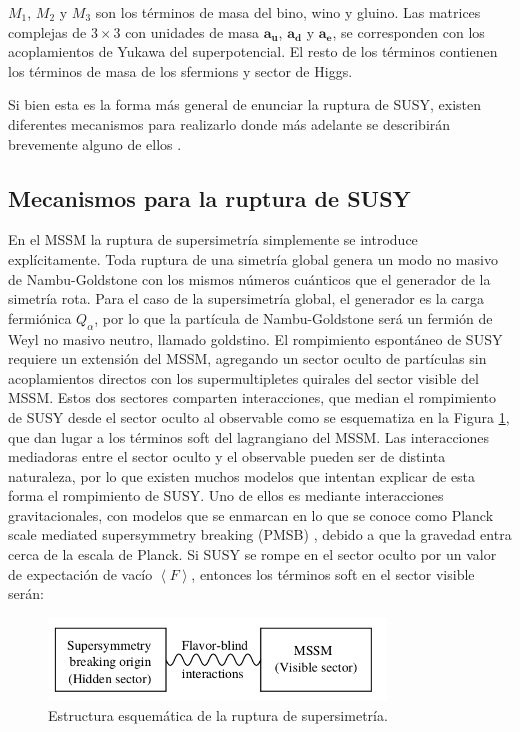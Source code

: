 $M_1$, $M_2$ y $M_3$ son los términos de masa del bino, wino y gluino. Las matrices complejas de $3\times3$ con unidades de masa $\textbf{a}_\textbf{u}$, $\textbf{a}_\textbf{d}$ y $\textbf{a}_\textbf{e}$, se corresponden con los acoplamientos de Yukawa del superpotencial. El resto de los términos contienen los términos de masa de los sfermions y sector de Higgs.

Si bien esta es la forma más general de enunciar la ruptura de SUSY, existen diferentes mecanismos para realizarlo donde más adelante se describirán brevemente alguno de ellos .

\subsection{Mecanismos para la ruptura de SUSY}

En el MSSM la ruptura de supersimetría simplemente se introduce explícitamente. Toda ruptura de una simetría global genera un modo no masivo de Nambu-Goldstone con los mismos números cuánticos que el generador de la simetría rota.
Para el caso de la supersimetría global, el generador es la carga fermiónica $Q_{\alpha}$,
por lo que la partícula de Nambu-Goldstone será un fermión de Weyl no masivo
neutro, llamado goldstino.
El rompimiento espontáneo de SUSY requiere un extensión del MSSM, agregando un sector oculto de partículas sin acoplamientos directos con los supermultipletes quirales del sector visible del
MSSM. Estos dos sectores comparten interacciones, que median el rompimiento de
SUSY desde el sector oculto al observable como se esquematiza en la Figura \ref{fig:hidden_sector}, que dan lugar a los términos soft del lagrangiano del MSSM.
Las interacciones mediadoras entre el sector oculto y el observable pueden ser
de distinta naturaleza, por lo que existen muchos modelos que intentan explicar de
esta forma el rompimiento de SUSY. Uno de ellos es mediante interacciones gravitacionales, con modelos que se enmarcan en lo que se conoce como Planck scale mediated supersymmetry breaking (PMSB) \cite{tesis_joaco}, debido a que la gravedad entra cerca de la escala de Planck. Si SUSY se rompe en el sector oculto
por un valor de expectación de vacío $\left< F \right>$, entonces los términos soft en el sector visible serán:

\begin{figure}
  \centering
  \includegraphics[width=0.8\textwidth]{images/hidden_sector.png}
  \caption{Estructura esquemática de la ruptura de supersimetría. }
  \label{fig:hidden_sector}
\end{figure}

